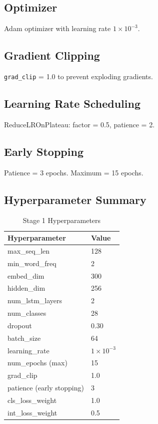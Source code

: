\documentclass[12pt, a4paper]{report}
\begin{document}
\subsection{Optimizer}

Adam optimizer with learning rate $1 \times 10^{-3}$.

\subsection{Gradient Clipping}

\texttt{grad\_clip} = 1.0 to prevent exploding gradients.

\subsection{Learning Rate Scheduling}

ReduceLROnPlateau: factor = 0.5, patience = 2.

\subsection{Early Stopping}

Patience = 3 epochs. Maximum = 15 epochs.

\subsection{Hyperparameter Summary}

\begin{table}[H]
    \centering
    \caption{Stage 1 Hyperparameters}
    \label{tab:stage1_hyper}
    \begin{tabular}{@{}ll@{}}
        \toprule
        \textbf{Hyperparameter} & \textbf{Value} \\
        \midrule
        max\_seq\_len & 128 \\
        min\_word\_freq & 2 \\
        embed\_dim & 300 \\
        hidden\_dim & 256 \\
        num\_lstm\_layers & 2 \\
        num\_classes & 28 \\
        dropout & 0.30 \\
        batch\_size & 64 \\
        learning\_rate & $1 \times 10^{-3}$ \\
        num\_epochs (max) & 15 \\
        grad\_clip & 1.0 \\
        patience (early stopping) & 3 \\
        cls\_loss\_weight & 1.0 \\
        int\_loss\_weight & 0.5 \\
        \bottomrule
    \end{tabular}
\end{table}
\end{document}
